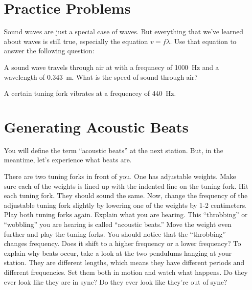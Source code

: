 \documentclass[10pt]{exam}
\begin{document}
\pagebreak

\section{Practice Problems}

Sound waves are just a special case of waves.  But everything that we've learned about waves is still true, especially the equation $v=f\lambda$.  Use that equation to answer the following question:

\begin{questions}
  \question 
    A sound wave travels through air at with a frequnecy of 1000~Hz and a wavelength of 0.343~m.  What is the speed of sound through air? \vs 

  \question 
    A certain tuning fork vibrates at a frequencey of 440~Hz.

\end{questions}


\section{Generating Acoustic Beats}

  You will define the term ``acoustic beats'' at the next station.  But, in the meantime, let's experience what beats are.

  \begin{questions}
    \question
      There are two tuning forks in front of you.  One has adjustable weights.  Make sure each of the weights is lined up with the indented line on the tuning fork.  Hit each tuning fork.  They should sound the same.
    \question 
      Now, change the frequency of the adjustable tuning fork slightly by lowering one of the weights by 1-2 centimeters.  Play both tuning forks again.  Explain what you are hearing.  \vs
    \question
      This ``throbbing'' or ``wobbling'' you are hearing is called ``acoustic beats.'' Move the weight even further and play the tuning forks.  You should notice that the ``throbbing'' changes frequency.  Does it shift to a higher frequency or a lower frequency? \vs
    \question
      To explain why beats occur, take a look at the two pendulums hanging at your station.  They are different lengths, which means they have different periods and different frequencies.  Set them both in motion and watch what happens.  Do they ever look like they are in sync?  Do they ever look like they're out of sync? \vs
  \end{questions}
\end{document}

